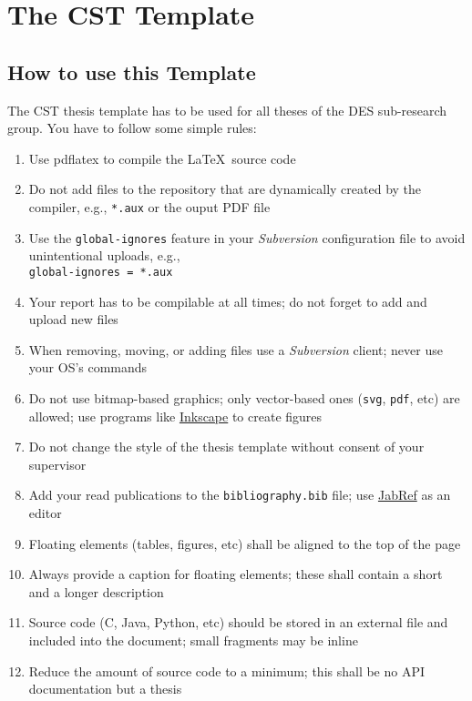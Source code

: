 \chapter{The CST Template}

\section{How to use this Template}
\label{secHowTo}
The \gls{CST} thesis template has to be used for all theses of the \gls{DES} sub-research group.
You have to follow some simple rules:
\begin{enumerate}
    \item Use \gls{pdflatex} to compile the \LaTeX\ source code
	\item Do not add files to the repository that are dynamically created by the compiler, e.g., \texttt{*.aux} or the ouput PDF file
	\item Use the \texttt{global-ignores} feature in your \textit{Subversion} configuration file to avoid unintentional uploads, e.g., \\ \texttt{global-ignores = *.aux}
	\item Your report has to be compilable at all times; do not forget to add and upload new files
	\item When removing, moving, or adding files use a \textit{Subversion} client; never use your \gls{OS}'s commands
	\item Do not use bitmap-based graphics; only vector-based ones (\texttt{svg}, \texttt{pdf}, etc) are allowed; use programs like \href{http://www.inkscape.org/}{Inkscape} to create figures
	\item Do not change the style of the thesis template without consent of your supervisor
	\item Add your read publications to the \texttt{bibliography.bib} file; use \href{http://jabref.sourceforge.net/}{JabRef} as an editor
	\item Floating elements (tables, figures, etc) shall be aligned to the top of the page
	\item Always provide a caption for floating elements; these shall contain a short and a longer description
	\item Source code (C, Java, Python, etc) should be stored in an external file and included into the document; small fragments may be inline
	\item Reduce the amount of source code to a minimum; this shall be no API documentation but a thesis
\end{enumerate}

